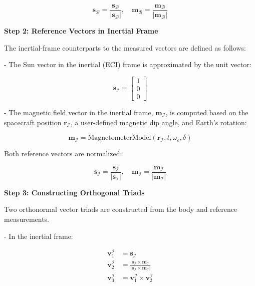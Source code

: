 \begin{equation}
    \mathbf{s}_{\mathcal{B}} = \frac{\mathbf{s}_{\mathcal{B}}}{|\mathbf{s}_{\mathcal{B}}|}, \quad
    \mathbf{m}_{\mathcal{B}} = \frac{\mathbf{m}_{\mathcal{B}}}{|\mathbf{m}_{\mathcal{B}}|}
\end{equation}

\textbf{Step 2: Reference Vectors in Inertial Frame}

The inertial-frame counterparts to the measured vectors are defined as follows:

- The Sun vector in the inertial (ECI) frame is approximated by the unit vector:

\begin{equation}
   \mathbf{s}_{\mathcal{I}} = \begin{bmatrix} 1 \\ 0 \\ 0 \end{bmatrix}
\end{equation}

- The magnetic field vector in the inertial frame, $\mathbf{m}_{\mathcal{I}}$, is computed based on the spacecraft position $\mathbf{r}_{\mathcal{I}}$, a user-defined magnetic dip angle, and Earth’s rotation:

\begin{equation}
   \mathbf{m}_{\mathcal{I}} = \text{MagnetometerModel}(\mathbf{r}_{\mathcal{I}}, t, \omega_e, \delta)
\end{equation}

Both reference vectors are normalized:

\begin{equation}
   \mathbf{s}_{\mathcal{I}} = \frac{\mathbf{s}_{\mathcal{I}}}{|\mathbf{s}_{\mathcal{I}}|}, \quad
   \mathbf{m}_{\mathcal{I}} = \frac{\mathbf{m}_{\mathcal{I}}}{|\mathbf{m}_{\mathcal{I}}|}
\end{equation}

\textbf{Step 3: Constructing Orthogonal Triads}

Two orthonormal vector triads are constructed from the body and reference measurements.

- In the inertial frame:

\begin{align}
    \mathbf{v}_1^{\mathcal{I}} &= \mathbf{s}_{\mathcal{I}} \\
    \mathbf{v}_2^{\mathcal{I}} &= \frac{\mathbf{s}_{\mathcal{I}} \times \mathbf{m}_{\mathcal{I}}}{|\mathbf{s}_{\mathcal{I}} \times \mathbf{m}_{\mathcal{I}}|} \\
    \mathbf{v}_3^{\mathcal{I}} &= \mathbf{v}_1^{\mathcal{I}} \times \mathbf{v}_2^{\mathcal{I}}
\end{align}

